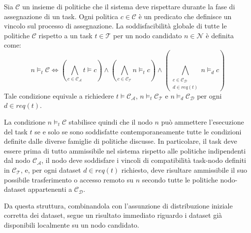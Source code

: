 \begin{definition}
    \label{def:politiche}
    Sia $\mathcal{C}$ un insieme di politiche che il sistema deve rispettare durante la fase di assegnazione di un task. Ogni politica $c \in \mathcal{C}$ è un predicato che definisce un vincolo sul processo di assegnazione. La soddisfacibilità globale di tutte le politiche $\mathcal{C}$ rispetto a un task $t \in \mathcal{T}$ per un nodo candidato $n \in \mathcal{N}$ è definita come:
    \begin{equation}
        n \models_t \mathcal{C}
        \iff
        \left( \bigwedge_{c \in \mathcal{C_A}} t \models c \right)
        \land
        \left( \bigwedge_{c \in \mathcal{C_T}} n \models_t c \right)
        \land
        \left( \bigwedge_{\substack{c \in \mathcal{C_D}\\ d \in req(t)}} n \models_d c \right)
    \end{equation}
    Tale condizione equivale a richiedere $t \models \mathcal{C_A}$, $n \models_t \mathcal{C_T}$ e $n \models_d \mathcal{C_D}$ per ogni $d \in req(t)$.
\end{definition}

La condizione $n \models_t \mathcal{C}$ stabilisce quindi che il nodo $n$ può ammettere l'esecuzione del task $t$ se e solo se sono soddisfatte contemporaneamente tutte le condizioni definite dalle diverse famiglie di politiche discusse. In particolare, il task deve essere prima di tutto ammissibile nel sistema rispetto alle politiche indipendenti dal nodo $\mathcal{C_A}$, il nodo deve soddisfare i vincoli di compatibilità task-nodo definiti in $\mathcal{C_T}$, e, per ogni dataset $d \in req(t)$ richiesto, deve risultare ammissibile il suo possibile trasferimento o accesso remoto su $n$ secondo tutte le politiche nodo-dataset appartenenti a $\mathcal{C_D}$.

Da questa struttura, combinandola con l'assunzione di distribuzione iniziale corretta dei dataset, segue un risultato immediato riguardo i dataset già disponibili localmente su un nodo candidato.

